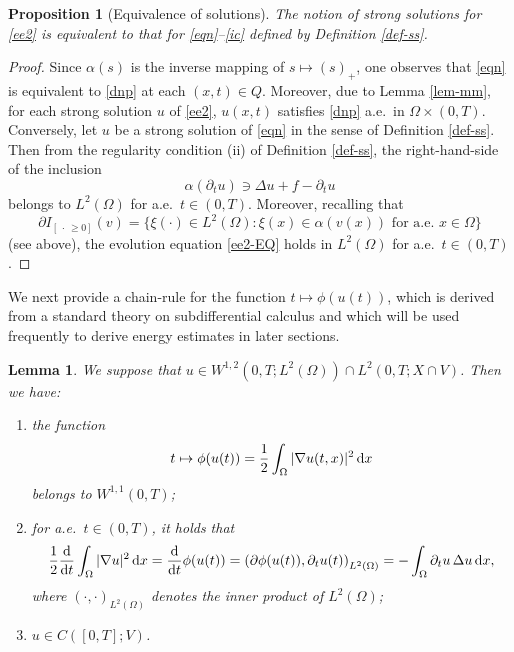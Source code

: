 \documentclass[reqno,10pt]{amsart}
\newtheorem{Lem}[Th]{Lemma}
\newtheorem{Prop}[Th]{Proposition}
\begin{document}
\begin{Prop}[Equivalence of solutions]
The notion of strong solutions for \eqref{ee2} is equivalent to that for
 \eqref{eqn}--\eqref{ic} defined by Definition {\rm \ref{def-ss}}.
\end{Prop}

\begin{proof}
Since $\alpha(s)$ is the inverse mapping of $s \mapsto (s)_+$, one observes
 that \eqref{eqn} is equivalent to \eqref{dnp} at each $(x,t) \in
 Q$. Moreover, due to Lemma \ref{lem-mm}, for each strong solution $u$
 of \eqref{ee2}, $u(x,t)$ satisfies \eqref{dnp} a.e.~in $\Omega \times
 (0,T)$. Conversely, let $u$ be a strong solution of \eqref{eqn} in the
 sense of Definition \ref{def-ss}. Then from the regularity condition {\rm
 (ii)} of Definition \ref{def-ss}, the right-hand-side of
 the inclusion 
$$
\alpha(\partial_t u) \ni \Delta u + f - \partial_t u
$$
belongs to $L^2(\Omega)$ for a.e.~$t \in (0,T)$.
Moreover, recalling that
$$
\partial {I_{[~\cdot\, \geq 0]}}(v) = \{
 \xi(\cdot) \in L^2(\Omega) \colon \xi(x) \in \alpha(v(x)) \mbox{ for a.e. } x \in \Omega \}
$$
(see above), the evolution equation \eqref{ee2-EQ} holds in
 $L^2(\Omega)$ for a.e.~$t \in (0,T)$.
\end{proof}

We next provide a chain-rule for the function $t \mapsto \phi(u(t))$,
which is derived from a standard theory on subdifferential calculus and
which will be used frequently to derive energy estimates in later
sections.

\begin{Lem}\label{lemforuq}
We suppose that $u\in W^{1,2}(0,T;L^2(\Omega)) \cap L^2(0,T;X \cap
 V)$. Then we have\/{\rm :}
\begin{enumerate}[{\rm (i)}]
\item
the function 
$$
t\mapsto \phi(u(t)) = \dfrac 1 2 \int_\Omega |\nabla u(t,x)|^2\,{\text{\rm d}} x
$$
belongs to $W^{1,1}(0,T)$\/{\rm ;}
\item
for a.e.~$t \in (0,T)$, it holds that
$$
\dfrac 1 2 \frac{\text{\rm d}}{{\text{\rm d}} t}\int_\Omega |\nabla u|^2\,{\text{\rm d}} x
= \dfrac{\text{\rm d}}{{\text{\rm d}} t} \phi(u(t))
= \left( \partial \phi(u(t)), \partial_t u(t) \right)_{L^2(\Omega)}
=-\int_\Omega \partial_t u \,\Delta u\,{\text{\rm d}} x,
$$
where $(\cdot,\cdot)_{L^2(\Omega)}$ denotes the inner product of
	     $L^2(\Omega)$\/{\rm ;}
\item
$u\in C([0,T];V)$.
\end{enumerate}

\end{Lem}
\end{document}
